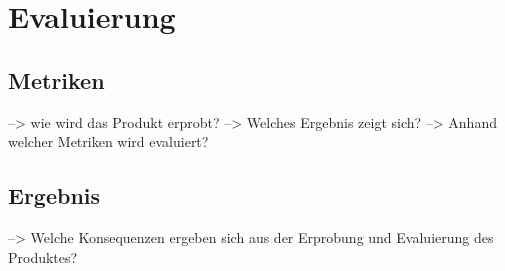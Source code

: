 \chapter{Evaluierung} \label{evaluierung}

\section{Metriken} \label{metriken}
--> wie wird das Produkt erprobt? 
--> Welches Ergebnis zeigt sich?
--> Anhand welcher Metriken wird evaluiert?

\section{Ergebnis} \label{ergebnis}
--> Welche Konsequenzen ergeben sich aus der Erprobung und Evaluierung des Produktes?